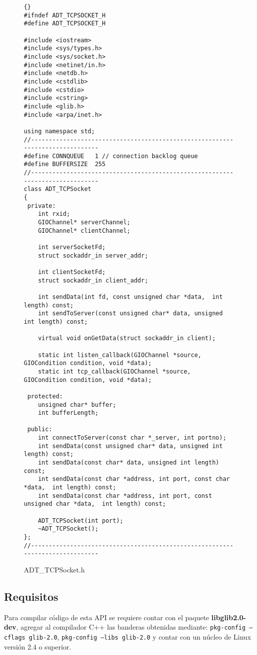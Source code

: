 \documentclass[a4paper,10pt]{article}
\begin{document}
\begin{figure}

  \lstset{language=c++}
  \lstset{commentstyle=\textit}
  \tiny
  \begin{lstlisting}[frame=trbl]{}
#ifndef ADT_TCPSOCKET_H
#define ADT_TCPSOCKET_H

#include <iostream>
#include <sys/types.h>
#include <sys/socket.h>
#include <netinet/in.h>
#include <netdb.h>
#include <cstdlib>
#include <cstdio>
#include <cstring>
#include <glib.h>
#include <arpa/inet.h>

using namespace std;
//------------------------------------------------------------------------------
#define	CONNQUEUE	1 // connection backlog queue
#define	BUFFERSIZE	255
//------------------------------------------------------------------------------
class ADT_TCPSocket
{
 private:
 	int rxid;
 	GIOChannel* serverChannel;
 	GIOChannel* clientChannel;
 
 	int serverSocketFd;
	struct sockaddr_in server_addr;
	
 	int clientSocketFd;
	struct sockaddr_in client_addr;
	
	int sendData(int fd, const unsigned char *data,  int length) const;
	int sendToServer(const unsigned char* data, unsigned int length) const;
 	
	virtual void onGetData(struct sockaddr_in client);
	
	static int listen_callback(GIOChannel *source, GIOCondition condition, void *data);
	static int tcp_callback(GIOChannel *source, GIOCondition condition, void *data);
	
 protected:
  	unsigned char* buffer;
  	int bufferLength;
  	
 public: 
 	int connectToServer(const char *_server, int portno);
 	int sendData(const unsigned char* data, unsigned int length) const;
 	int sendData(const char* data, unsigned int length) const;
 	int sendData(const char *address, int port, const char *data,  int length) const;
 	int sendData(const char *address, int port, const unsigned char *data,  int length) const;

 	ADT_TCPSocket(int port);
	~ADT_TCPSocket();
};
//------------------------------------------------------------------------------

  \end{lstlisting}
  \caption{ADT\_TCPSocket.h}
  \label{joystick.h}
\end{figure}
  \subsection{Requisitos}
    Para compilar código de esta API se requiere contar con el paquete \textbf{libglib2.0-dev}, agregar al compilador C++ las banderas obtenidas mediante: \texttt{pkg-config --cflags glib-2.0},   \texttt{pkg-config --libs glib-2.0} y contar con un núcleo de Linux versión 2.4 o superior.
\end{document}
